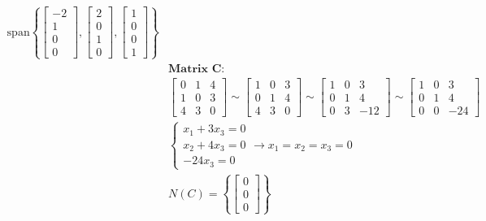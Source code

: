 \documentclass{article}
\begin{document}
\begin{align*}
\text{span}\left\{\begin{bmatrix} -2 \\ 1 \\ 0 \\ 0 \end{bmatrix}, \begin{bmatrix} 2 \\ 0 \\ 1 \\ 0 \end{bmatrix}, \begin{bmatrix} 1 \\ 0 \\ 0 \\ 1 \end{bmatrix}\right\}
\\
&\textbf{Matrix C:}
\\
&\begin{bmatrix} 0 & 1 & 4 \\ 1 & 0 & 3 \\ 4 & 3 & 0 \end{bmatrix} \sim
\begin{bmatrix} 1 & 0 & 3 \\ 0 & 1 & 4 \\ 4 & 3 & 0 \end{bmatrix} \sim
\begin{bmatrix} 1 & 0 & 3 \\ 0 & 1 & 4 \\ 0 & 3 & -12 \end{bmatrix} \sim
\begin{bmatrix} 1 & 0 & 3 \\ 0 & 1 & 4 \\ 0 & 0 & -24 \end{bmatrix}
\\
&\begin{cases} x_{1} + 3x_{3} = 0 \\ x_{2} + 4x_{3} = 0 \\ -24x_{3} = 0 \end{cases} \rightarrow
x_{1} = x_{2} = x_{3} = 0
\\
&N(C) = \left\{\begin{bmatrix} 0 \\ 0 \\ 0 \end{bmatrix}\right\}
\end{align*}

\newpage
\end{document}
